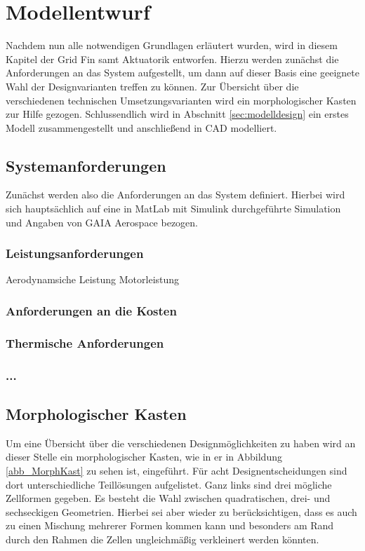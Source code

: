 \chapter{Modellentwurf}\label{sec:modellentwurf}
Nachdem nun alle notwendigen Grundlagen erläutert wurden, wird in diesem Kapitel der Grid Fin samt Aktuatorik entworfen. Hierzu werden zunächst die Anforderungen an das System aufgestellt, um dann auf dieser Basis eine geeignete Wahl der Designvarianten treffen zu können. Zur Übersicht über die verschiedenen technischen Umsetzungsvarianten wird ein morphologischer Kasten zur Hilfe gezogen. Schlussendlich wird in Abschnitt \ref{sec:modelldesign} ein erstes Modell zusammengestellt und anschließend in CAD modelliert.
\section{Systemanforderungen}
Zunächst werden also die Anforderungen an das System definiert. Hierbei wird sich hauptsächlich auf eine in MatLab mit Simulink durchgeführte Simulation und Angaben von GAIA Aerospace bezogen.
\subsection{Leistungsanforderungen}
Aerodynamsiche Leistung
Motorleistung
\subsection{Anforderungen an die Kosten}
\subsection{Thermische Anforderungen}
\subsection{...}

\section{Morphologischer Kasten}
Um eine Übersicht über die verschiedenen Designmöglichkeiten zu haben wird an dieser Stelle ein morphologischer Kasten, wie in er in Abbildung \ref{abb_MorphKast} zu sehen ist, eingeführt. Für acht Designentscheidungen sind dort unterschiedliche Teillösungen aufgelistet. Ganz links sind drei mögliche Zellformen gegeben. Es besteht die Wahl zwischen quadratischen, drei- und sechseckigen Geometrien. Hierbei sei aber wieder zu berücksichtigen, dass es auch zu einen Mischung mehrerer Formen kommen kann und besonders am Rand durch den Rahmen die Zellen ungleichmäßig verkleinert werden könnten.

